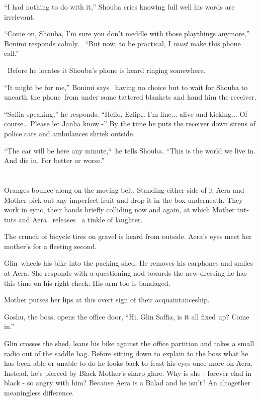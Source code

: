 \documentclass[twoside,11pt]{book}
\begin{document}
``I had nothing to do with it,'' Shouba cries knowing full well his words are irrelevant.

``Come on, Shouba, I'm sure you don't meddle with those playthings anymore,'' Bonimi responds
calmly. \ ``But now, to be practical, I \textit{must }make this phone call.''

\ Before he locates it Shouba's phone is heard ringing somewhere.

``It might be for me,'' Bonimi says \ having no choice but to wait for Shouba to unearth the
phone~from under some tattered{ }blankets and hand him the receiver.

``Saffia speaking,'' he responds. ``Hello, Ezlip{\dots} I'm fine... alive and
kicking... Of course{\dots} Please let Janha know -'' By the time he puts the receiver down sirens of
police cars and ambulances shriek outside.

``The car will be here any minute,``~he tells Shouba. ``This is the world we live
in. And die in. For better or worse.''


\bigskip

\chapter{}

Oranges bounce along on the moving belt. Standing either side of it Aera and Mother pick out any imperfect fruit and
drop it in the box underneath. They work in sync, their hands briefly colliding now and again, at which Mother tut-tuts
and Aera \ releases \ a tinkle of laughter.

The crunch of bicycle tires on gravel is heard from outside. Aera's eyes meet her mother's for a fleeting second.

Glin~wheels his bike into the packing shed. He removes his earphones and smiles at Aera. She responds with a questioning
nod towards the new dressing he has - this time on his right cheek. His arm too is bandaged.

Mother purses her lips at this overt sign of their acquaintanceship.~~~~~~~

Goshu, the boss, opens the office door, ``Hi, Glin Saffia, is it all fixed up? Come in.''

Glin crosses the shed, leans his bike against the office partition and takes a small radio out of the saddle bag. Before
sitting down to explain to the boss what he has been able or unable to do he looks back to feast his eyes once more on
Aera. Instead, he's pierced by Black Mother's sharp glare. Why is she - forever clad in black - so angry with him?
Because Aera is a Balad and he isn't? An altogether meaningless difference.
\end{document}
